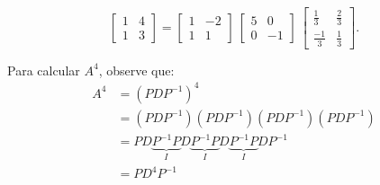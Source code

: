 \documentclass[a4paper,12pt]{article}
\begin{document}
\begin{enumerate}
    $$
    \begin{bmatrix}
        1 & 4\\
        1 & 3
    \end{bmatrix} = \begin{bmatrix}
        1 & -2 \\
        1 & 1
    \end{bmatrix}\ \begin{bmatrix}
        5 &  0\\
        0 & -1
    \end{bmatrix}\ \begin{bmatrix}
         \frac{1}{3} &  \frac{2}{3}\\
         \frac{-1}{3} &  \frac{1}{3}
    \end{bmatrix}.
    $$

    Para calcular $A^4$, observe que:
    \begin{align*}
        A^4 &= (P D P^{-1})^4 \\
        &= (P D P^{-1})(P D P^{-1})(P D P^{-1})(P D P^{-1}) \\
        &= P D \underbrace{P^{-1}P}_{I} D \underbrace{P^{-1}P}_{I} D \underbrace{P^{-1}P}_{I} D P^{-1} \\
        &= P D^4 P^{-1}
    \end{align*}
    

\end{enumerate}
\end{document}
